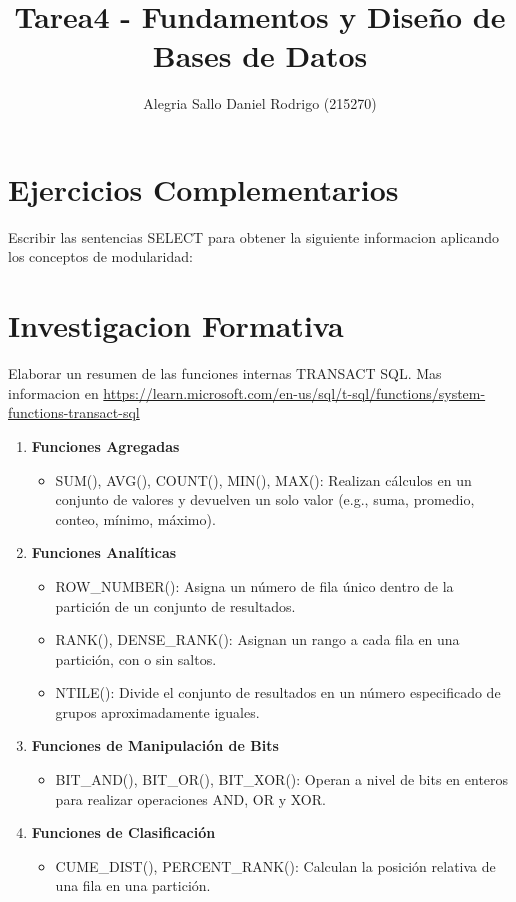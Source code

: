 \documentclass[a4paper,openany,11pt]{article}
\title{Tarea4 - Fundamentos y Diseño de Bases de Datos}
\author{Alegria Sallo Daniel Rodrigo (215270)}
\begin{document}
\section[5]{Ejercicios Complementarios}
Escribir las sentencias SELECT para obtener la siguiente informacion aplicando
los conceptos de modularidad:




\newpage
\section[6]{Investigacion Formativa}
Elaborar un resumen de las funciones internas TRANSACT SQL.
Mas informacion en \url{https://learn.microsoft.com/en-us/sql/t-sql/functions/system-functions-transact-sql}

\begin{enumerate}
    \item{\textbf{Funciones Agregadas}}
    \begin{itemize}
        \item SUM(), AVG(), COUNT(), MIN(), MAX(): Realizan cálculos en un
            conjunto de valores y devuelven un solo valor (e.g., suma,
            promedio, conteo, mínimo, máximo).
    \end{itemize}


    \item{\textbf{Funciones Analíticas}}
    \begin{itemize}
        \item ROW\_NUMBER(): Asigna un número de fila único dentro de la
            partición de un conjunto de resultados.
        \item RANK(), DENSE\_RANK(): Asignan un rango a cada fila en una
            partición, con o sin saltos.
        \item NTILE(): Divide el conjunto de resultados en un número
            especificado de grupos aproximadamente iguales.
    \end{itemize}


    \item{\textbf{Funciones de Manipulación de Bits}}
    \begin{itemize}
        \item BIT\_AND(), BIT\_OR(), BIT\_XOR(): Operan a nivel de bits en
            enteros para realizar operaciones AND, OR y XOR.
    \end{itemize}



    \item{\textbf{Funciones de Clasificación}}
    \begin{itemize}
        \item CUME\_DIST(), PERCENT\_RANK(): Calculan la posición relativa de una
            fila en una partición.
    \end{itemize}



\end{enumerate}
\end{document}
